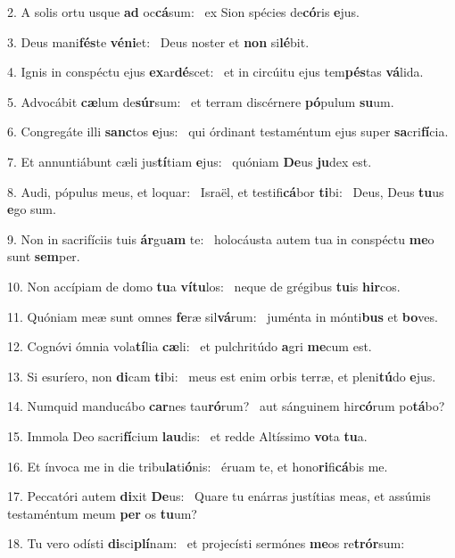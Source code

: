 2. A solis ortu usque \textbf{ad} oc\textbf{cá}sum: \ast\  ex Sion spécies de\textbf{có}ris \textbf{e}jus.\

3. Deus mani\textbf{fés}te \textbf{vé}\textbf{ni}et: \ast\  Deus noster et \textbf{non} si\textbf{lé}bit.\

4. Ignis in conspéctu ejus \textbf{ex}ar\textbf{dé}scet: \ast\  et in circúitu ejus tem\textbf{pés}tas \textbf{vá}lida.\

5. Advocábit \textbf{cæ}lum de\textbf{súr}sum: \ast\  et terram discérnere \textbf{pó}pulum \textbf{su}um.\

6. Congregáte illi \textbf{sanc}tos \textbf{e}jus: \ast\  qui órdinant testaméntum ejus super \textbf{sa}cri\textbf{fí}cia.\

7. Et annuntiábunt cæli jus\textbf{tí}tiam \textbf{e}jus: \ast\  quóniam \textbf{De}us \textbf{ju}dex est.\

8. Audi, pópulus meus, et loquar: \dag\  Israël, et testifi\textbf{cá}bor \textbf{ti}bi: \ast\  Deus, Deus \textbf{tu}us \textbf{e}go sum.\

9. Non in sacrifíciis tuis \textbf{ár}gu\textbf{am} te: \ast\  holocáusta autem tua in conspéctu \textbf{me}o sunt \textbf{sem}per.\

10. Non accípiam de domo \textbf{tu}a \textbf{ví}\textbf{tu}los: \ast\  neque de grégibus \textbf{tu}is \textbf{hir}cos.\

11. Quóniam meæ sunt omnes \textbf{fe}ræ sil\textbf{vá}rum: \ast\  juménta in mónti\textbf{bus} et \textbf{bo}ves.\

12. Cognóvi ómnia vola\textbf{tí}lia \textbf{cæ}li: \ast\  et pulchritúdo \textbf{a}gri \textbf{me}cum est.\

13. Si esuríero, non \textbf{di}cam \textbf{ti}bi: \ast\  meus est enim orbis terræ, et pleni\textbf{tú}do \textbf{e}jus.\

14. Numquid manducábo \textbf{car}nes tau\textbf{ró}rum? \ast\  aut sánguinem hir\textbf{có}rum po\textbf{tá}bo?\

15. Immola Deo sacri\textbf{fí}cium \textbf{lau}dis: \ast\  et redde Altíssimo \textbf{vo}ta \textbf{tu}a.\

16. Et ínvoca me in die tribu\textbf{la}ti\textbf{ó}nis: \ast\  éruam te, et hono\textbf{ri}fi\textbf{cá}bis me.\

17. Peccatóri autem \textbf{di}xit \textbf{De}us: \ast\  Quare tu enárras justítias meas, et assúmis testaméntum meum \textbf{per} os \textbf{tu}um?\

18. Tu vero odísti \textbf{di}sci\textbf{plí}nam: \ast\  et projecísti sermónes \textbf{me}os re\textbf{trór}sum:\

